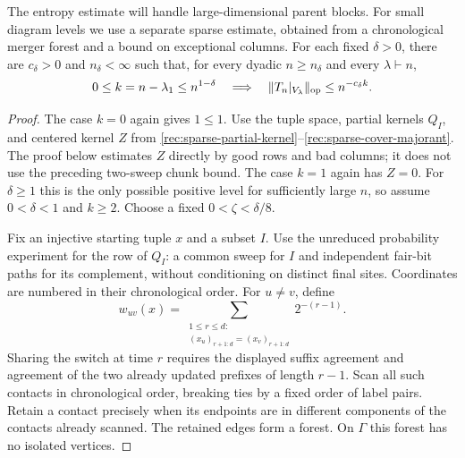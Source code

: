 The entropy estimate will handle large-dimensional parent blocks.
For small diagram levels we use a separate sparse estimate, obtained
from a chronological merger forest and a bound on exceptional columns.
For each fixed $\delta>0$, there are $c_\delta>0$ and
$n_\delta<\infty$ such that, for every dyadic $n\ge n_\delta$
and every $\lambda\vdash n$,
\begin{equation}\label{rec:forest-sparse-general}
 0\le k=n-\lambda_1\le n^{1-\delta}
 \quad\Longrightarrow\quad
 \|T_n|_{V_\lambda}\|_{\mathrm{op}}\le n^{-c_\delta k}.
\end{equation}
\begin{proof}
The case $k=0$ again gives $1\le1$.
Use the tuple space, partial kernels $Q_I$, and centered
kernel $Z$ from
\eqref{rec:sparse-partial-kernel}--\eqref{rec:sparse-cover-majorant}.
The proof below estimates $Z$ directly by good rows and bad
columns; it does not use the preceding two-sweep chunk bound.
The case $k=1$ again has $Z=0$.
For $\delta\ge1$ this is the only possible positive level
for sufficiently large $n$, so assume $0<\delta<1$ and $k\ge2$.
Choose a fixed $0<\zeta<\delta/8$.

Fix an injective starting tuple $x$ and a subset $I$.
Use the unreduced probability experiment for the row of
$Q_I$: a common sweep for $I$ and independent fair-bit
paths for its complement, without conditioning on distinct
final sites.  Coordinates are numbered in their chronological
order.  For $u\ne v$, define
\[
 w_{uv}(x)=
 \sum_{\substack{1\le r\le d:\\
 (x_u)_{r+1:d}=(x_v)_{r+1:d}}}2^{-(r-1)}.
\]
Sharing the switch at time $r$ requires the displayed suffix
agreement and agreement of the two already updated prefixes
of length $r-1$.  Scan all such contacts in chronological
order, breaking ties by a fixed order of label pairs.
Retain a contact precisely when its endpoints are in different
components of the contacts already scanned.  The retained
edges form a forest.  On $\Gamma$ this forest has no isolated
vertices.


\end{proof}
